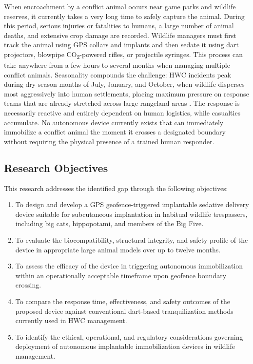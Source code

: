 \documentclass[12pt,a4paper]{article}
\begin{document}
    When encroachment by a conflict animal occurs near game parks and wildlife reserves, it
    currently takes a very long time to safely capture the animal. During this period, serious
    injuries or fatalities to humans, a large number of animal deaths, and extensive crop
    damage are recorded. Wildlife managers must first track the animal using GPS collars and
    implants and then sedate it using dart projectors, blowpipe CO\textsubscript{2}-powered
    rifles, or projectile syringes. This process can take anywhere from a few hours to several
    months when managing multiple conflict animals. Seasonality compounds the challenge:
    HWC incidents peak during dry-season months of July, January, and October, when wildlife
    disperses most aggressively into human settlements, placing maximum pressure on response
    teams that are already stretched across large rangeland areas \cite{manoa2020}. The
    response is necessarily reactive and entirely dependent on human logistics, while casualties
    accumulate. No autonomous device currently exists that can immediately immobilize a
    conflict animal the moment it crosses a designated boundary without requiring the physical
    presence of a trained human responder.

    \subsection{Research Objectives}

    This research addresses the identified gap through the following objectives:

    \begin{enumerate}
        \item To design and develop a GPS geofence-triggered implantable sedative delivery
        device suitable for subcutaneous implantation in habitual wildlife trespassers,
        including big cats, hippopotami, and members of the Big Five.
        \item To evaluate the biocompatibility, structural integrity, and safety profile of
        the device in appropriate large animal models over up to twelve months.
        \item To assess the efficacy of the device in triggering autonomous immobilization
        within an operationally acceptable timeframe upon geofence boundary crossing.
        \item To compare the response time, effectiveness, and safety outcomes of the proposed
        device against conventional dart-based tranquilization methods currently used in
        HWC management.
        \item To identify the ethical, operational, and regulatory considerations governing
        deployment of autonomous implantable immobilization devices in wildlife management.
    \end{enumerate}
\end{document}
